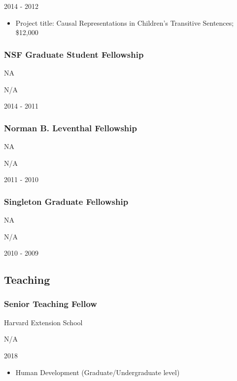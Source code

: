 \documentclass[
]{article}
\providecommand{\tightlist}{%
  \setlength{\itemsep}{0pt}\setlength{\parskip}{0pt}}
\begin{document}
2014 - 2012

\begin{itemize}
\tightlist
\item
  Project title: Causal Representations in Children's Transitive
  Sentences; \$12,000
\end{itemize}

\hypertarget{nsf-graduate-student-fellowship}{%
\subsubsection{NSF Graduate Student
Fellowship}\label{nsf-graduate-student-fellowship}}

NA

N/A

2014 - 2011

\hypertarget{norman-b.-leventhal-fellowship}{%
\subsubsection{Norman B. Leventhal
Fellowship}\label{norman-b.-leventhal-fellowship}}

NA

N/A

2011 - 2010

\hypertarget{singleton-graduate-fellowship}{%
\subsubsection{Singleton Graduate
Fellowship}\label{singleton-graduate-fellowship}}

NA

N/A

2010 - 2009

\hypertarget{teaching}{%
\subsection{Teaching}\label{teaching}}

\hypertarget{senior-teaching-fellow}{%
\subsubsection{Senior Teaching Fellow}\label{senior-teaching-fellow}}

Harvard Extension School

N/A

2018

\begin{itemize}
\tightlist
\item
  Human Development (Graduate/Undergraduate level)
\end{itemize}
\end{document}
